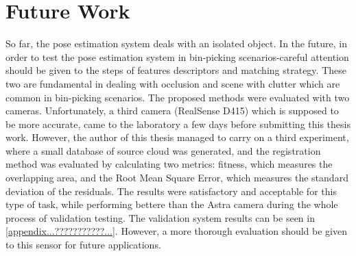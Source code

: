 \chapter{Future Work}
\label{chap:futurework}


So far, the pose estimation system deals with an isolated object. In the future, in order to test the pose estimation system in bin-picking scenarios-careful attention should be given to the steps of features descriptors and matching strategy. These two are fundamental in dealing with occlusion and scene with clutter which are common in bin-picking scenarios. The proposed methods were evaluated with two cameras. Unfortunately, a third camera (RealSense D415) which is supposed to be more accurate, came to the laboratory a few days before submitting this thesis work. However, the author of this thesis managed to carry on a third experiment, where a small database of source cloud was generated, and the registration method was evaluated by calculating two metrics: fitness, which measures the overlapping area, and the Root Mean Square Error, which measures the standard deviation of the residuals.
 The results were satisfactory and acceptable for this type of task, while performing bettere than the Astra camera during the whole process of validation testing. The validation system results can be seen in  \ref{appendix...???????????...}. However, a more thorough evaluation should be given to this sensor for future applications.  

